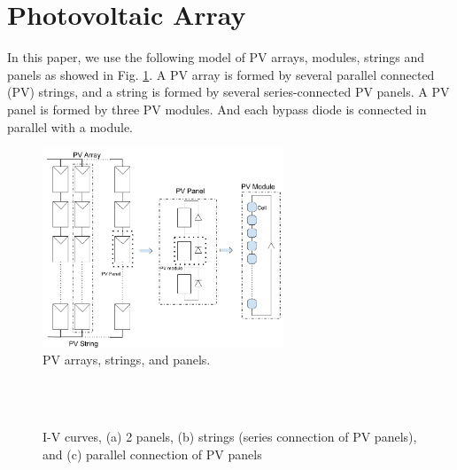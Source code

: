 \documentclass[conference]{IEEEtran}
\begin{document}
\section{Photovoltaic Array} \label{array}
In this paper, we use the following model of PV arrays, modules, strings and panels as showed in Fig. \ref{fig1}. A PV array is formed by several parallel connected (PV) strings, and a string is formed by several series-connected PV panels. A PV panel is formed by three PV modules.
And each bypass diode is connected in parallel with a module.
\begin{figure}[htbp]
\centerline{\includegraphics[width=7.2cm]{paper-fig1.png}}
\caption{PV arrays, strings, and panels.}
\label{fig1}
\end{figure}
\begin{figure}
\centering 
{}\\
 \\
\caption{I-V curves, (a) 2 panels, (b) strings (series connection of PV panels), and (c) parallel connection of  PV panels}
\end{figure}
\end{document}
